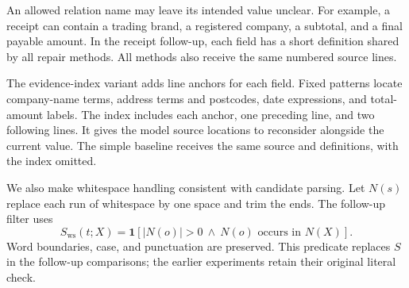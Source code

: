 An allowed relation name may leave its intended value unclear. For example,
a receipt can contain a trading brand, a registered company, a subtotal, and
a final payable amount. In the receipt follow-up, each field has a short
definition shared by all repair methods. All methods also receive the same
numbered source lines.

The evidence-index variant adds line anchors for each field. Fixed patterns
locate company-name terms, address terms and postcodes, date expressions,
and total-amount labels. The index includes each anchor, one preceding line,
and two following lines. It gives the model source locations to reconsider
alongside the current value. The simple baseline receives the same source
and definitions, with the index omitted.

We also make whitespace handling consistent with candidate parsing. Let
$N(s)$ replace each run of whitespace by one space and trim the ends. The
follow-up filter uses
\begin{equation}
    S_{\mathrm{ws}}(t;X)=\mathbf1[|N(o)|>0\ \wedge\
    N(o)\text{ occurs in }N(X)].
\end{equation}
Word boundaries, case, and punctuation are preserved. This predicate replaces
$S$ in the follow-up comparisons; the earlier experiments retain their
original literal check.
